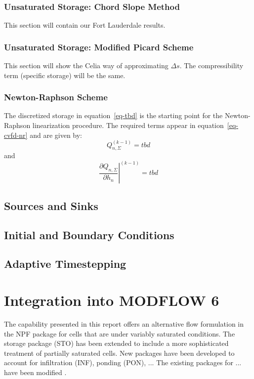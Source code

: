 \documentclass[fleqn]{article}
\begin{document}
\subsubsection*{Unsaturated Storage: Chord Slope Method}
This section will contain our Fort Lauderdale results.

\subsubsection*{Unsaturated Storage: Modified Picard Scheme}
This section will show the Celia way of approximating $\Delta s$.
The compressibility term (specific storage) will be the same.

\subsubsection*{Newton-Raphson Scheme}
The discretized storage in equation~\ref{eq-tbd} is the starting
point for the Newton-Raphson linearization procedure. The required
terms appear in equation~\ref{eq-cvfd-nr} and are given by:
\begin{equation}
  Q_{n,\Sigma}^{(k-1)} = tbd
\end{equation}
and
\begin{equation}
  \left.\frac{\partial Q_{n,\Sigma}}{\partial h_n}\right|^{(k-1)} = tbd
\end{equation}

\subsection{Sources and Sinks}
\subsection{Initial and Boundary Conditions}
\subsection{Adaptive Timestepping}

\section{Integration into MODFLOW 6}
The capability presented in this report offers an alternative flow
formulation in the NPF package for cells that are under variably 
saturated conditions. The storage package (STO) has been extended
to include a more sophisticated treatment of partially saturated
cells. New packages have been developed to account for infiltration (INF),
ponding (PON), ... The existing packages for ... have been modified .
\end{document}
